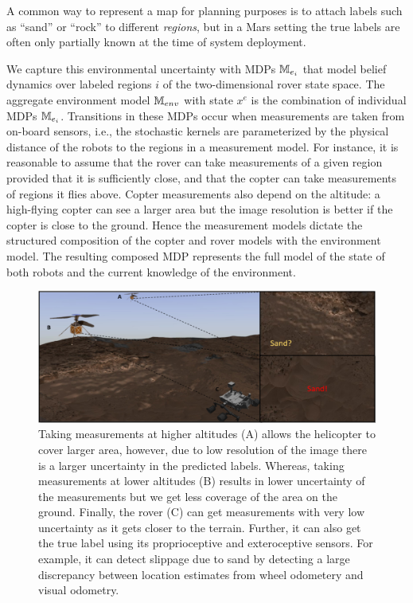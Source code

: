 \documentclass[conference]{IEEEtran}
\begin{document}
\smallskip
{}
A common way to represent a map for planning purposes is to attach labels such as ``sand'' or ``rock'' to different \emph{regions}, but in a Mars setting the true labels are often only partially known at the time of system deployment.

We capture this environmental uncertainty with MDPs $\mathbb{M}_{e_i}$ that model belief dynamics over labeled regions $i$ of the two-dimensional rover state space. The aggregate environment model $\mathbb{M}_{env}$ with state $x^e$ is the combination of individual MDPs $\mathbb{M}_{e_i}$. Transitions in these MDPs occur when measurements are taken from on-board sensors, i.e., the stochastic kernels are parameterized by the physical distance of the robots to the regions in a measurement model. For instance, it is reasonable to assume that the rover can take measurements of a given region provided that it is sufficiently close, and that the copter can take measurements of regions it flies above. Copter measurements also depend on the altitude: a high-flying copter can see a larger area but the image resolution is better if the copter is close to the ground. Hence the measurement models dictate the structured composition of the copter and rover models with the environment model. The resulting composed MDP represents the full model of the state of both robots and the current knowledge of the environment.

\begin{figure}[h!]
    \centering
    \includegraphics[width=\columnwidth]{BeliefSpaceTemporalLogic/figs/SandDectection.png}
    \caption{Taking measurements at  higher altitudes (A) allows the helicopter to cover larger area, however, due to low resolution of the image there is a larger uncertainty in the predicted labels. Whereas, taking measurements at lower altitudes (B) results in lower uncertainty of the measurements but we get less coverage of the area on the ground. Finally, the rover (C) can get measurements with very low uncertainty as it gets closer to the terrain. Further, it can also get the true label using its proprioceptive and exteroceptive sensors. For example, it can detect slippage due to sand by detecting a large discrepancy between location estimates from wheel odometery and visual odometry.}
    \label{fig:MeasurementPossibilities}
\end{figure}
\end{document}
